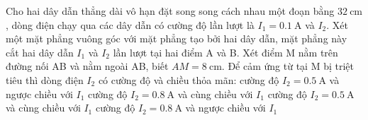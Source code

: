 \begin{ex}
	Cho hai dây dẫn thẳng dài vô hạn đặt song song cách nhau một đoạn bằng $\SI{32}{\centi\meter}$, dòng điện chạy qua các dây dẫn có cường độ lần lượt là $I_1=\SI{0.1}{\ampere}$ và $I_2$. Xét một mặt phẳng vuông góc với mặt phẳng tạo bởi hai dây dẫn, mặt phẳng này cắt hai dây dẫn $I_1$ và $I_2$ lần lượt tại hai điểm A và B. Xét điểm M nằm trên đường nối AB và nằm ngoài AB, biết $AM=\SI{8}{\centi\meter}$. Để cảm ứng từ tại M bị triệt tiêu thì dòng điện $I_2$ có cường độ và chiều thỏa mãn:	 
	\choice
	{\True cường độ $I_2=\SI{0.5}{\ampere}$ và ngược chiều với $I_1$}
	{cường độ $I_2=\SI{0.8}{\ampere}$ và cùng chiều với $I_1$}
	{cường độ $I_2=\SI{0.5}{\ampere}$ và cùng chiều với $I_1$}
	{cường độ $I_2=\SI{0.8}{\ampere}$ và ngược chiều với $I_1$}
\end{ex}

